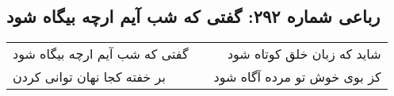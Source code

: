 \begin{center}
\section*{رباعی شماره ۲۹۲: گفتی که شب آیم ارچه بیگاه شود}
\label{sec:sh292}
\begin{longtable}{l p{0.5cm} r}
گفتی که شب آیم ارچه بیگاه شود
&&
شاید که زبان خلق کوتاه شود
\\
بر خفته کجا نهان توانی کردن
&&
کز بوی خوش تو مرده آگاه شود
\\
\end{longtable}
\end{center}
